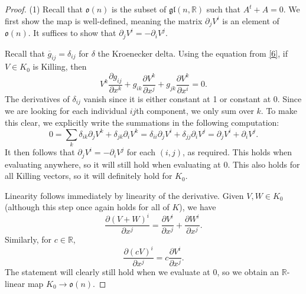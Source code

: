 \documentclass[11pt, letterpaper]{article}
\begin{document}
\begin{proof}
	(1) Recall that $\mathfrak{o} (n)$ is the subset of $\mathfrak{gl} (n,\mathbb{R} )$ such that $A^t+A=0$. We first show the map is well-defined, meaning the matrix $\partial _jV^i$ is an element of $\mathfrak{o} (n)$. It suffices to show that $\partial _jV^i=-\partial _iV^j$.

	Recall that $\overline{g}_{ij} =\delta _{ij} $ for $\delta $ the Kroenecker delta. Using the equation from \cref{6}, if $V\in K_0$ is Killing, then
	\[
		V^k \frac{\partial g_{ij} }{\partial x^k} +g_{ik} \frac{\partial V^k}{\partial x^j} +g_{jk} \frac{\partial V^k}{\partial x^i} =0
	.\]
	The derivatives of $\delta _{ij} $ vanish since it is either constant at 1 or constant at 0. Since we are looking for each individual $ij$th component, we only sum over $k$. To make this clear, we explicitly write the summations in the following computation:
	\[
		0= \sum_{k} \delta _{ik} \partial _jV^k+\delta _{jk} \partial _iV^k=\delta _{ii} \partial _jV^i + \delta _{jj} \partial _iV^j = \partial _jV^i + \partial _iV^j
	.\]
	It then follows that $\partial _jV^i = -\partial _iV^j$ for each $(i,j)$, as required. This holds when evaluating anywhere, so it will still hold when evaluating at 0. This also holds for all Killing vectors, so it will definitely hold for $K_0$.

	Linearity follows immediately by linearity of the derivative. Given $V,W\in K_0$ (although this step once again holds for all of $K$), we have
	\[
		\frac{\partial (V+W)^i}{\partial x^j} = \frac{\partial V^i}{\partial x^j} +\frac{\partial W^i}{\partial x^j} 
	.\]
	Similarly, for $c\in\mathbb{R} $,
	\[
		\frac{\partial (cV)^i}{\partial x^j} =c\frac{\partial V^i}{\partial x^j} 
	.\]
	The statement will clearly still hold when we evaluate at 0, so we obtain an $\mathbb{R} $-linear map $K_0 \to \mathfrak{o} (n)$.


\end{proof}
\end{document}
